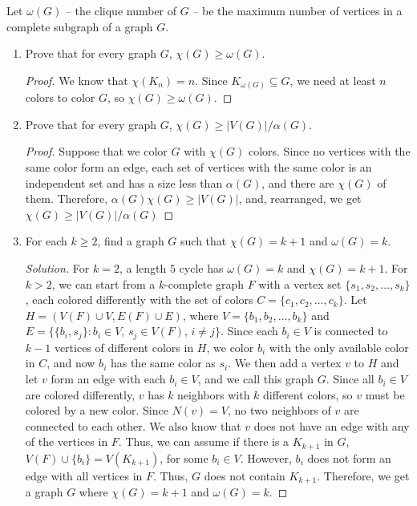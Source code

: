 \documentclass{article}
\newenvironment{problem}[2][Question]{\begin{trivlist}
\item[\hskip \labelsep {\bfseries #1}\hskip \labelsep {\bfseries #2.}]}{\end{trivlist}}
\begin{document}
\newpage

\begin{problem}{4.7.14}
    Let $\omega(G)$ – the clique number of $G$ – be the maximum number of vertices in a complete subgraph of a graph $G$.
\end{problem}

\begin{enumerate}[label=(\alph*)]
    \item Prove that for every graph $G$, $\chi(G) \geq \omega(G)$.

    \begin{proof}
        We know that $\chi(K_n) = n$. Since $K_{\omega(G)} \subseteq G$, we need at least $n$ colors to color $G$, so $\chi(G) \geq \omega(G)$.
    \end{proof}

    \item Prove that for every graph $G$, $\chi(G) \geq |V(G)|/\alpha(G)$.

    \begin{proof}
        Suppose that we color $G$ with $\chi(G)$ colors. Since no vertices with the same color form an edge, each set of vertices with the same color is an independent set and has a size less than $\alpha(G)$, and there are $\chi(G)$ of them. Therefore, $\alpha(G)\chi(G) \geq |V(G)|$, and, rearranged, we get $\chi(G) \geq |V(G)| / \alpha(G)$
    \end{proof}
    
    \item For each $k \geq 2$, find a graph $G$ such that $\chi(G) = k + 1$ and $\omega(G) = k$.
    
    \begin{proof}[Solution]
        For $k = 2$, a length $5$ cycle has $\omega(G) = k$ and $\chi(G) = k + 1$. For $k > 2$, we can start from a $k$-complete graph $F$ with a vertex set $\{s_1, s_2, \dots, s_k\}$, each colored differently with the set of colors $C = \{c_1, c_2, \dots, c_k\}$. Let $H = (V(F) \cup V, E(F) \cup E)$, where $V = \{b_1, b_2, \dots, b_k\}$ and $E = \{\{b_i, s_j\} : b_i \in V, \, s_j \in V(F), \, i \neq j\}$. Since each $b_i \in V$ is connected to $k - 1$ vertices of different colors in $H$, we color $b_i$ with the only available color in $C$, and now $b_i$ has the same color as $s_i$. We then add a vertex $v$ to $H$ and let $v$ form an edge with each $b_i \in V$, and we call this graph $G$. Since all $b_i \in V$ are colored differently, $v$ has $k$ neighbors with $k$ different colors, so $v$ must be colored by a new color. Since $N(v) = V$, no two neighbors of $v$ are connected to each other. We also know that $v$ does not have an edge with any of the vertices in $F$. Thus, we can assume if there is a $K_{k+1}$ in $G$, $V(F) \cup \{b_i\} = V(K_{k+1})$, for some $b_i \in V$. However, $b_i$ does not form an edge with all vertices in $F$. Thus, $G$ does not contain $K_{k+1}$. Therefore, we get a graph $G$ where $\chi(G) = k + 1$ and $\omega(G) = k$. 
    \end{proof}


\end{enumerate}
\end{document}
